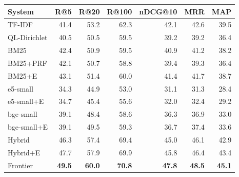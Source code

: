 \begin{tabular}{lrrrrrr}
\toprule
System & R@5 & R@20 & R@100 & nDCG@10 & MRR & MAP \\
\midrule
TF-IDF & 41.4 & 53.2 & 62.3 & 42.1 & 42.6 & 39.5 \\
QL-Dirichlet & 40.5 & 50.5 & 59.5 & 39.2 & 39.2 & 36.4 \\
BM25 & 42.4 & 50.9 & 59.5 & 40.9 & 41.2 & 38.2 \\
BM25{+}PRF & 42.1 & 50.7 & 58.8 & 39.4 & 39.3 & 36.4 \\
BM25{+}E & 43.1 & 51.4 & 60.0 & 41.4 & 41.7 & 38.7 \\
e5-small & 34.3 & 44.9 & 53.0 & 31.1 & 31.3 & 28.4 \\
e5-small{+}E & 34.7 & 45.4 & 55.6 & 32.0 & 32.4 & 29.2 \\
bge-small & 39.1 & 48.4 & 58.6 & 36.3 & 36.9 & 33.0 \\
bge-small{+}E & 39.1 & 49.5 & 59.3 & 36.7 & 37.4 & 33.6 \\
Hybrid & 46.3 & 57.4 & 69.4 & 45.0 & 46.1 & 42.9 \\
Hybrid{+}E & 47.7 & 57.9 & 69.9 & 45.8 & 46.4 & 43.4 \\
Frontier & \textbf{49.5} & \textbf{60.0} & \textbf{70.8} & \textbf{47.8} & \textbf{48.5} & \textbf{45.1} \\
\bottomrule
\end{tabular}
